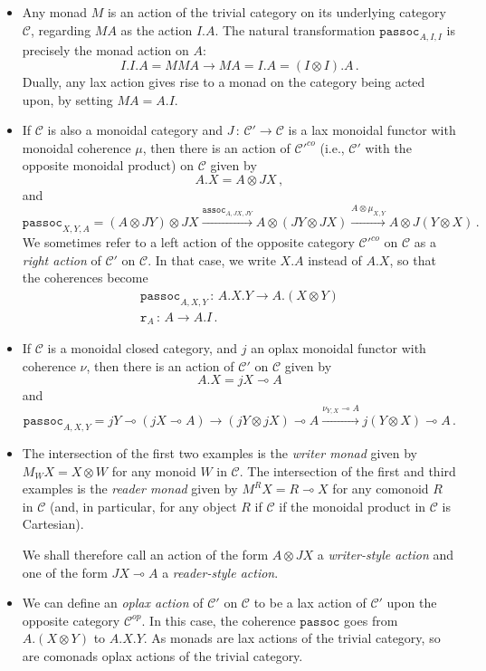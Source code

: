 \documentclass{svproc}
\newcommand\C{\mathcal{C}}
\newcommand\from{\,\colon\,}
\newcommand{\passoc}{\texttt{passoc}}
\newcommand{\assoc}{\texttt{assoc}}
\newcommand\tensor\otimes
\newcommand\run{\texttt{r}}
\renewcommand\implies\multimap
\begin{document}
\begin{example}
  \begin{itemize}
    \item Any monad $M$ is an action of the trivial category on its underlying category $\C$, regarding $MA$ as the action $I.A$.
      The natural transformation $\passoc_{A,I,I}$ is precisely the monad action on $A$:
      \[
        I.I.A = MMA \to M A = I.A = (I\tensor I).A\,.
        \]
      Dually, any lax action gives rise to a monad on the category being acted upon, by setting $MA = A.I$.
    \item If $\C$ is also a monoidal category and $J\from \C'\to \C$ is a lax monoidal functor with monoidal coherence $\mu$, then there is an action of $\C'^{co}$ (i.e., $\C'$ with the opposite monoidal product) on $\C$ given by
      \[
        A.X = A \tensor JX\,,
        \]
      and
      \[
        \passoc_{X,Y,A}=
        (A \tensor JY) \tensor JX \xrightarrow{\assoc_{A,JX,JY}}
        A \tensor (JY \tensor JX) \xrightarrow{A \tensor \mu_{X,Y}}
        A \tensor J(Y\tensor X)\,.
        \]
      We sometimes refer to a left action of the opposite category $\C'^{co}$ on $\C$ as a \emph{right action} of $\C'$ on $\C$.  
      In that case, we write $X.A$ instead of $A.X$, so that the coherences become
      \begin{gather*}
        \passoc_{A,X,Y}\from A.X.Y \to A.(X\tensor Y)\\
        \run_A\from A \to A.I\,.
      \end{gather*}

    \item If $\C$ is a monoidal closed category, and $j$ an oplax monoidal functor with coherence $\nu$, then there is an action of $\C'$ on $\C$ given by
      \[
        A.X = jX \implies A
        \]
      and
      \[
        \passoc_{A,X,Y}=jY \implies (jX \implies A) \to
        (jY \tensor jX) \implies A \xrightarrow{\nu_{Y,X}\implies A}
        j(Y \tensor X) \implies A\,.
        \]
    \item The intersection of the first two examples is the \emph{writer monad} given by $M_WX = X\tensor W$ for any monoid $W$ in $\C$.  
      The intersection of the first and third examples is the \emph{reader monad} given by $M^RX = R \implies X$ for any comonoid $R$ in $\C$ (and, in particular, for any object $R$ if $\C$ if the monoidal product in $\C$ is Cartesian).
      
      We shall therefore call an action of the form $A \tensor JX$ a \emph{writer-style action} and one of the form $JX \implies A$ a \emph{reader-style action}.
    \item We can define an \emph{oplax action} of $\C'$ on $\C$ to be a lax action of $\C'$ upon the opposite category $\C^{op}$.  
      In this case, the coherence $\passoc$ goes from $A.(X\tensor Y)$ to $A.X.Y$.  
      As monads are lax actions of the trivial category, so are comonads oplax actions of the trivial category.
  \end{itemize}
\end{example}



\end{document}
